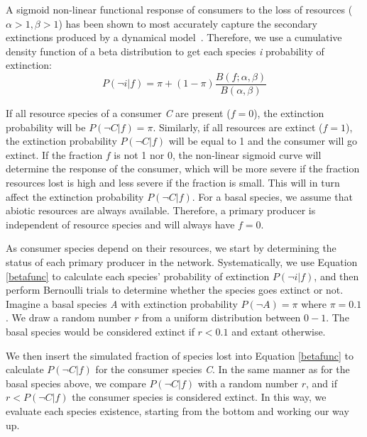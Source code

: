 \documentclass[12pt]{article}
\begin{document}
\begin{spacing}{2.0}
        
        A sigmoid non-linear functional response of consumers to the loss of resources ($\alpha >1, \beta >1$) has been shown to most accurately capture the secondary extinctions produced by a dynamical model~\citep{Eklof2013}.
        Therefore, we use a cumulative density function of a beta distribution to get each species \textit{i} probability of extinction:
        \begin{equation}
        \label{betafunc}
        P(\lnot i|f) = \pi + (1 - \pi) \frac{B(f;\alpha,\beta)}{B(\alpha,\beta)}
        \end{equation}
        

        \noindent If all resource species of a consumer \textit{C} are present ($f = 0$), the extinction probability will be $P(\lnot C|f) = \pi$. 
        Similarly, if all resources are extinct ($f = 1$), the extinction probability $P(\lnot C|f)$ will be equal to 1 and the consumer will go extinct.
        If the fraction $f$ is not 1 nor 0, the non-linear sigmoid curve will determine the response of the consumer, which will be more severe if the fraction resources lost is high and less severe if the fraction is small. 
        This will in turn affect the extinction probability $P(\lnot C|f)$. 
        For a basal species, we assume that abiotic resources are always available. 
        Therefore, a primary producer is independent of resource species and will always have $f = 0$.  
        

        As consumer species depend on their resources, we start by determining the status of each primary producer in the network.
        Systematically, we use Equation \ref{betafunc} to calculate each species' probability of extinction $P(\lnot i|f)$, and then perform Bernoulli trials to determine whether the species goes extinct or not. 
        Imagine a basal species \textit{A} with extinction probability $P(\lnot A) = \pi$ where $\pi = 0.1$. 
        We draw a random number $r$ from a uniform distribution between $0-1$.
        The basal species would be considered extinct if $r < 0.1$ and extant otherwise. 
        
        
        We then insert the simulated fraction of species lost into Equation \ref{betafunc} to calculate $P(\lnot C|f)$ for the consumer species \textit{C}. 
        In the same manner as for the basal species above, we compare $P(\lnot C|f)$ with a random number $r$, and if $r < P(\lnot C|f)$ the consumer species is considered extinct. 
        In this way, we evaluate each species existence, starting from the bottom and working our way up.
        

\end{spacing}
\end{document}

